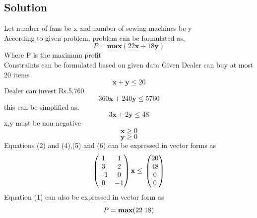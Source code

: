 \documentclass[journal,12pt,twocolumn]{IEEEtran}
\let\vec\mathbf
\begin{document}
\begin{tableofcontents}
\section{Solution}
Let number of fans be x and number of sewing machines be y\\
According to given problem, problem can be formulated as,\\
\vspace{2cm}
\begin{equation}
	P=\vec{max}(22\vec{x}+18\vec{y})
\end{equation}
Where P is the maximum profit\\
Constraints can be formulated based on given data
Given Dealer can buy at most 20 items\\
\begin{equation}
	\vec{x}+\vec{y}\leq20
\end{equation}
Dealer can invest Rs.5,760
\begin{equation}
	360\vec{x}+240\vec{y}\leq5760
\end{equation}
this can be simplified as,\\
\begin{equation}
	3\vec{x}+2\vec{y}\leq48
\end{equation}
x,y must be non-negative
\begin{equation}
	\vec{x}\geq0
\end{equation}
\begin{equation}
	\vec{y}\geq0
\end{equation}
Equations (2) and (4),(5) and (6) can be expressed in vector forms as\\
\begin{equation}
\begin{pmatrix}
1 & 1\\
3 & 2\\
-1 & 0\\
0 & -1\\
\end{pmatrix}
	\vec{x}\\
\leq\\
\begin{pmatrix}
20\\
48\\
0\\
0
\end{pmatrix}
\end{equation}
Equation (1) can also be expressed in vector form as\\
\begin{equation}
	P=\vec{max}(22 \hspace{0.1cm} 18)

\end{equation}
\end{tableofcontents}
\end{document}

